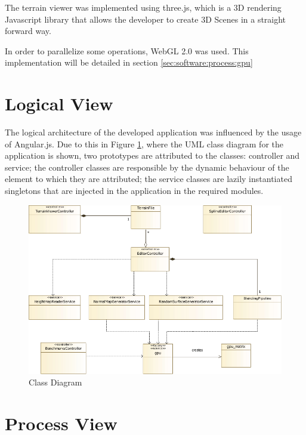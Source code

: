       The terrain viewer was implemented using three.js, which is a 3D rendering Javascript library that allows the developer to create 3D Scenes in a straight forward way. 
      
      In order to parallelize some operations, WebGL 2.0 was used. This implementation will be detailed in section \ref{sec:software:process:gpu}
    
  \section {Logical View} %
  
	  The logical architecture of the developed application was influenced by the usage of Angular.js. Due to this in Figure \ref{fig:class_diagram}, where the UML class diagram for the application is shown, two prototypes are attributed to the classes: controller and service; the controller classes are responsible by the dynamic behaviour of the element to which they are attributed; the service classes are lazily instantiated singletons that are injected in the application in the required modules.
    
      \begin{figure}[H]
    	\begin{center}
    	  \includegraphics[width=\textwidth]{images/diagrams/class.pdf}
    	\end{center}
    	\caption{Class Diagram}
    	\label{fig:class_diagram}
      \end{figure}
    
  \section {Process View}
    
